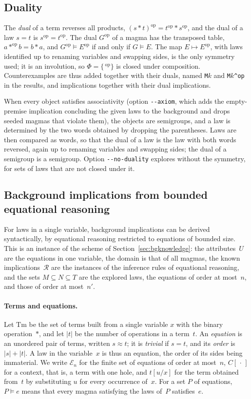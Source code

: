 \documentclass[11pt,a4paper]{article}
\theoremstyle{definition}
\theoremstyle{remark}
\newcommand{\code}[1]{\texttt{#1}}
\newcommand{\op}{^{\mathrm{op}}}
\begin{document}
\subsection{Duality}\label{sec:duality}

The \emph{dual} of a term reverses all products, $(s * t)\op = t\op * s\op$, and the dual of a law $s = t$ is $s\op = t\op$. The dual $G\op$ of a magma has the transposed table, $a *\op b = b * a$, and $G\op \models E\op$ if and only if $G \models E$. The map $E \mapsto E\op$, with laws identified up to renaming variables and swapping sides, is the only symmetry used; it is an involution, so $\Phi = \{\,{}\op\}$ is closed under composition. Counterexamples are thus added together with their duals, named \code{M}$k$ and \code{M}$k$\code{\^{}op} in the results, and implications together with their dual implications.

When every object satisfies associativity (option \code{-{}-axiom}, which adds the empty-premise implication concluding the given laws to the background and drops seeded magmas that violate them), the objects are semigroups, and a law is determined by the two words obtained by dropping the parentheses. Laws are then compared as words, so that the dual of a law is the law with both words reversed, again up to renaming variables and swapping sides; the dual of a semigroup is a semigroup. Option \code{-{}-no-duality} explores without the symmetry, for sets of laws that are not closed under it.

\subsection{Background implications from bounded equational reasoning}\label{sec:background}

For laws in a single variable, background implications can be derived syntactically, by equational reasoning restricted to equations of bounded size. This is an instance of the scheme of Section~\ref{sec:bgknowledge}: the attributes~$U$ are the equations in one variable, the domain is that of all magmas, the known implications~$\mathcal{R}$ are the instances of the inference rules of equational reasoning, and the sets $M \subseteq N \subseteq T$ are the explored laws, the equations of order at most~$n$, and those of order at most~$n'$.

\paragraph{Terms and equations.}
Let $\mathrm{Tm}$ be the set of terms built from a single variable $x$ with the binary operation~$*$, and let $|t|$ be the number of operations in a term~$t$. An \emph{equation} is an unordered pair of terms, written $s \approx t$; it is \emph{trivial} if $s = t$, and its \emph{order} is $|s| + |t|$. A law in the variable~$x$ is thus an equation, the order of its sides being immaterial. We write $\mathcal{E}_n$ for the finite set of equations of order at most~$n$, $C[\,\cdot\,]$ for a context, that is, a term with one hole, and $t[u/x]$ for the term obtained from~$t$ by substituting $u$ for every occurrence of~$x$. For a set $P$ of equations, $P \models e$ means that every magma satisfying the laws of~$P$ satisfies~$e$.
\end{document}

